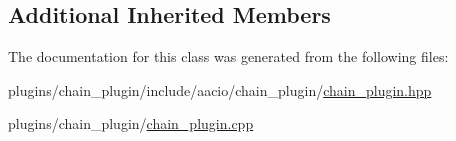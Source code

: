 \subsection*{Additional Inherited Members}


The documentation for this class was generated from the following files\+:\begin{DoxyCompactItemize}
\item 
plugins/chain\+\_\+plugin/include/aacio/chain\+\_\+plugin/\mbox{\hyperlink{chain__plugin_8hpp}{chain\+\_\+plugin.\+hpp}}\item 
plugins/chain\+\_\+plugin/\mbox{\hyperlink{chain__plugin_8cpp}{chain\+\_\+plugin.\+cpp}}\end{DoxyCompactItemize}
